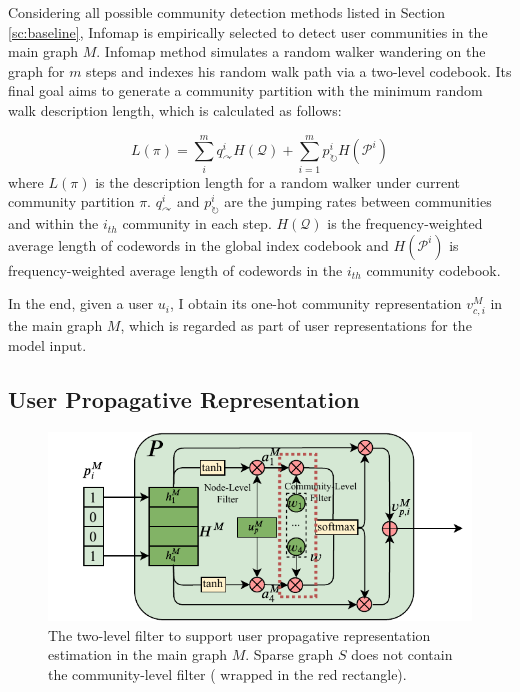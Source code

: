 Considering all possible community detection methods listed in Section \ref{sc:baseline}, Infomap is empirically selected to detect user communities in the main graph $M$. Infomap method simulates a random walker wandering on the graph for $m$ steps and indexes his random walk path via a two-level codebook. Its final goal aims to generate a community partition with the minimum random walk description length, which is calculated as follows:

\begin{equation} 
\textit{$L(\pi)$} = \sum_{i}^{m}q_{\curvearrowright}^{i}H(\mathcal{Q})+\sum_{i=1}^{m} \textit{$p_{\circlearrowright}^{i}$}H(\textit{$\mathcal{P}^{i}$}) 
\end{equation}
where \textit{$L(\pi)$} is the description length for a random walker under current community partition $\pi$. $q_{\curvearrowright}^{i}$ and $p_{\circlearrowright}^{i}$ are the jumping rates between communities and within the $i_{th}$ community in each step. $H(\mathcal{Q})$ is the frequency-weighted average length of codewords in the global index codebook and $H(\mathcal{P}^{i})$ is frequency-weighted average length of codewords in the $i_{th}$ community codebook.


In the end, given a user $u_i$, I obtain its one-hot community representation $v_{c,i}^M$ in the main graph $M$, which is regarded as part of user representations for the model input.

\subsection{User Propagative Representation}\label{sc:upr}


\begin{figure}  
	\centering
	\includegraphics[width=\columnwidth]{img/chapter4/propagation.pdf}
	\caption{The two-level filter to support user propagative representation estimation in the main graph $M$. Sparse graph $S$ does not contain the community-level filter ( wrapped in the red rectangle).}
	\label{fig:propagation}
\end{figure}

